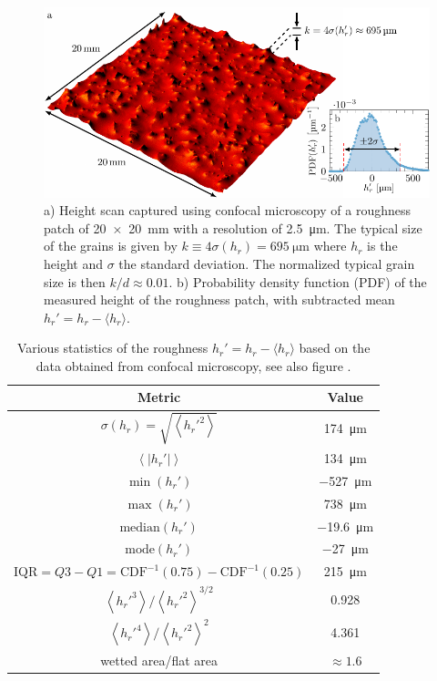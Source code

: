 %
\begin{figure}
    \centering
    \includegraphics{fig1_roughness.pdf}
    \caption{a) Height scan captured using confocal microscopy of a roughness patch of \SI[product-units = repeat]{20 x 20}{\milli\metre} with a resolution of \SI{2.5}{\micro\meter}. The typical size of the grains is given by $k \equiv 4\sigma(h_r) = \SI{695}{\micro \meter}$ where $h_r$ is the height and $\sigma$ the standard deviation. The normalized typical grain size is then $k/d\approx 0.01$. b) Probability density function (PDF) of the measured height of the roughness patch, with subtracted mean $h_r' = h_r - \langle h_r \rangle$.}
    \label{fig:roughness}
\end{figure}%

\begin{table}
\centering
\begin{tabular}{cc}
Metric & Value \\
\hline
$\sigma(h_r) = \sqrt{\left \langle h_r'^2 \right \rangle}$ & \SI{174}{\micro\meter} \\
$\left \langle \left| h_r' \right| \right \rangle$ & \SI{134}{\micro\meter} \\
$\min(h_r')$ & \SI{-527}{\micro\meter} \\
$\max(h_r')$ & \SI{738}{\micro\meter} \\
$\mathrm{median}(h_r')$ & \SI{-19.6}{\micro\meter} \\
$\mathrm{mode}(h_r')$ & \SI{-27}{\micro\meter} \\
$\mathrm{IQR}=Q3-Q1=\mathrm{CDF}^{-1}(0.75)-\mathrm{CDF}^{-1}(0.25)$ & \SI{215}{\micro\meter} \\
$\left \langle h_r'^3 \right \rangle / \left \langle h_r'^2 \right \rangle^{3/2}$ & 0.928 \\
$\left \langle h_r'^4 \right \rangle / \left \langle h_r'^2 \right \rangle^2$ & 4.361 \\
wetted area/flat area & $\approx 1.6$
\end{tabular}
\caption{Various statistics of the roughness $h_r' = h_r - \langle h_r \rangle$ based on the data obtained from confocal microscopy, see also figure \protect{\ref{fig:roughness}}.}
\label{tbl:roughness}
\end{table}%
\clearpage
